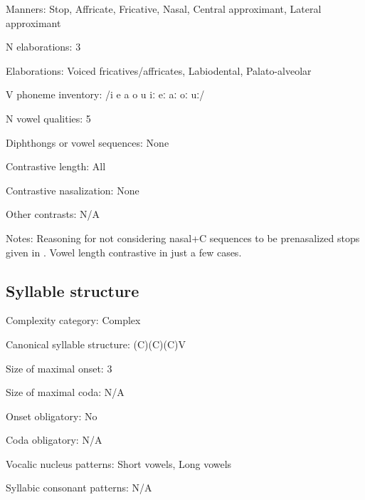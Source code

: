 {\begin{appendixdesc}
\item[Manners:] Stop, Affricate, Fricative, Nasal, Central approximant, Lateral approximant

\item[N elaborations:] 3

\item[Elaborations:] Voiced fricatives/affricates, Labiodental, Palato-alveolar

\item[V phoneme inventory:] /i e a o u iː eː aː oː uː/

\item[N vowel qualities:] 5

\item[Diphthongs or vowel sequences:] None

\item[Contrastive length:] All

\item[Contrastive nasalization:] None

\item[Other contrasts:] N/A

\item[Notes:] Reasoning for not considering nasal+C sequences to be prenasalized stops given in \citet[24]{Kawasha2003}. Vowel length contrastive in just a few cases.
\end{appendixdesc}
\subsection*{Syllable structure}
\begin{appendixdesc}

\item[Complexity category:] Complex

\item[Canonical syllable structure:] (C)(C)(C)V \citep[20--21]{Kawasha2003}

\item[Size of maximal onset:] 3

\item[Size of maximal coda:] N/A

\item[Onset obligatory:] No

\item[Coda obligatory:] N/A

\item[Vocalic nucleus patterns:] Short vowels, Long vowels

\item[Syllabic consonant patterns:] N/A


\end{appendixdesc}}
